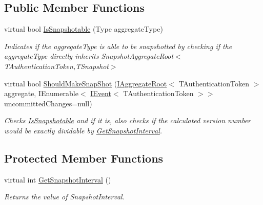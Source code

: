 \subsection*{Public Member Functions}
\begin{DoxyCompactItemize}
\item 
virtual bool \hyperlink{classCqrs_1_1Snapshots_1_1DefaultSnapshotStrategy_acdbb918ac01b526aedb5fa9a3879887a_acdbb918ac01b526aedb5fa9a3879887a}{Is\+Snapshotable} (Type aggregate\+Type)
\begin{DoxyCompactList}\small\item\em Indicates if the {\itshape aggregate\+Type}  is able to be snapshotted by checking if the {\itshape aggregate\+Type}  directly inherits Snapshot\+Aggregate\+Root$<$\+T\+Authentication\+Token,\+T\+Snapshot$>$ \end{DoxyCompactList}\item 
virtual bool \hyperlink{classCqrs_1_1Snapshots_1_1DefaultSnapshotStrategy_a9cdb3d79c55e2eb2796639b273d49ed9_a9cdb3d79c55e2eb2796639b273d49ed9}{Should\+Make\+Snap\+Shot} (\hyperlink{interfaceCqrs_1_1Domain_1_1IAggregateRoot}{I\+Aggregate\+Root}$<$ T\+Authentication\+Token $>$ aggregate, I\+Enumerable$<$ \hyperlink{interfaceCqrs_1_1Events_1_1IEvent}{I\+Event}$<$ T\+Authentication\+Token $>$$>$ uncommitted\+Changes=null)
\begin{DoxyCompactList}\small\item\em Checks \hyperlink{classCqrs_1_1Snapshots_1_1DefaultSnapshotStrategy_acdbb918ac01b526aedb5fa9a3879887a_acdbb918ac01b526aedb5fa9a3879887a}{Is\+Snapshotable} and if it is, also checks if the calculated version number would be exactly dividable by \hyperlink{classCqrs_1_1Snapshots_1_1DefaultSnapshotStrategy_a3540a6d621d8c23816da761f929d83a7_a3540a6d621d8c23816da761f929d83a7}{Get\+Snapshot\+Interval}. \end{DoxyCompactList}\end{DoxyCompactItemize}
\subsection*{Protected Member Functions}
\begin{DoxyCompactItemize}
\item 
virtual int \hyperlink{classCqrs_1_1Snapshots_1_1DefaultSnapshotStrategy_a3540a6d621d8c23816da761f929d83a7_a3540a6d621d8c23816da761f929d83a7}{Get\+Snapshot\+Interval} ()
\begin{DoxyCompactList}\small\item\em Returns the value of Snapshot\+Interval. \end{DoxyCompactList}\end{DoxyCompactItemize}



